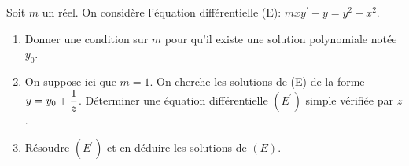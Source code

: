 \documentclass[a4paper, 11pt,reqno]{article}
\begin{document}
%
\begin{exercice}  \;
Soit $m$ un r\'eel. On consid\`ere l'\'equation diff\'erentielle (E): $mxy^{\prime} -y=y^2-x^2$.
\begin{enumerate}
\item Donner une condition sur $m$ pour qu'il existe une solution polynomiale not\'ee $y_0$.
\item On suppose ici que $m=1$. On cherche les solutions de (E) de la forme $y=y_0+\displaystyle\frac{1}{z}$. D\'eterminer une \'equation diff\'erentielle $(E^{\prime})$ simple v\'erifi\'ee par $z$.
\item R\'esoudre $(E^{\prime})$ et en d\'eduire les solutions de $(E)$.
\end{enumerate}
\end{exercice}
\end{document}
